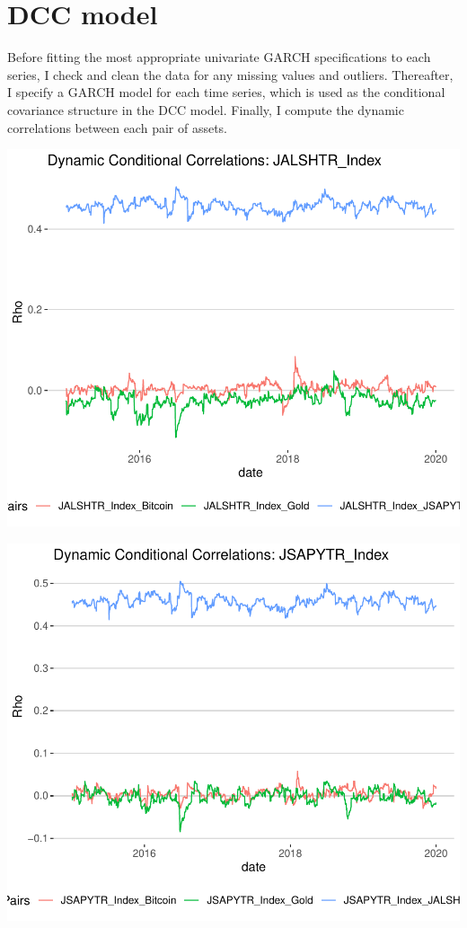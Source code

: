 \documentclass[11pt,preprint, authoryear]{elsarticle}
\numberwithin{equation}{section}
\numberwithin{figure}{section}
\numberwithin{table}{section}
\begin{document}
\hypertarget{dcc-model}{%
\section{DCC model}\label{dcc-model}}

Before fitting the most appropriate univariate GARCH specifications to
each series, I check and clean the data for any missing values and
outliers. Thereafter, I specify a GARCH model for each time series,
which is used as the conditional covariance structure in the DCC model.
Finally, I compute the dynamic correlations between each pair of assets.

\includegraphics{FinMetrics-Essay_files/figure-latex/unnamed-chunk-8-1.pdf}

\includegraphics{FinMetrics-Essay_files/figure-latex/unnamed-chunk-9-1.pdf}
\end{document}
